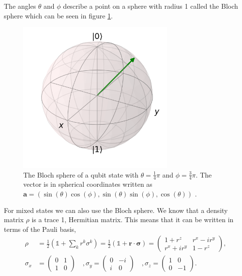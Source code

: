 The angles $\theta$ and $\phi$ describe a point on a sphere with radius 1 called the Bloch sphere which can be seen in figure \ref{fig:bloch_sphere}. 
\begin{figure}[ht!]
    \centering
    \includegraphics[width=0.7\textwidth]{figures/chapter1/bloch_sphere.png}
    \caption{The Bloch sphere of a qubit state with $\theta = \frac{1}{4}\pi$ and  $\phi = \frac{3}{4}\pi$. The vector is in spherical coordinates written as $\mathbf{a} = (\sin(\theta) \cos(\phi), \sin(\theta) \sin(\phi), \cos(\theta))$  \cite{Johansson2013}.}
    \label{fig:bloch_sphere}
\end{figure}
For mixed states we can also use the Bloch sphere. We know that a density matrix $\rho$ is a trace 1, Hermitian matrix. This means that it can be written in terms of the Pauli basis,
\begin{align}
    \rho &= \frac{1}{2} (\mathbb{1} + \sum_{k} r^k \sigma^k ) = \frac{1}{2}(\mathbb{1} + \mathbf{r} \cdot \bm{\sigma}) =  
            \begin{pmatrix}
                1 + r^z & r^x - i r^y\\
                r^x + i r^y & 1 - r^z  
            \end{pmatrix}\nonumber,\\
    \sigma_x &= \begin{pmatrix}
                    0 & 1\\
                    1 & 0  
            \end{pmatrix} \quad,
    \sigma_y = \begin{pmatrix}
                    0 & -i\\
                    i & 0  
            \end{pmatrix} \quad,
    \sigma_z = \begin{pmatrix}
                    1 & 0\\
                    0 & -1  
            \end{pmatrix} \label{eq:pauli_mats}.
\end{align}
